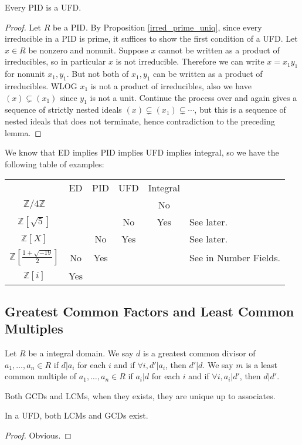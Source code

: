 \begin{theorem}
    Every PID is a UFD.
\end{theorem}
\begin{proof}
    Let $R$ be a PID.
    By Proposition \ref{irred_prime_uniq}, since every irreducible in a PID is prime, it suffices to show the first condition of a UFD.
    Let $x\in R$ be nonzero and nonunit.
    Suppose $x$ cannot be written as a product of irreducibles, so in particular $x$ is not irreducible.
    Therefore we can write $x=x_1y_1$ for nonunit $x_1,y_1$.
    But not both of $x_1,y_1$ can be written as a product of irreducibles.
    WLOG $x_1$ is not a product of irreducibles, also we have $(x)\subsetneq (x_1)$ since $y_1$ is not a unit.
    Continue the process over and again gives a sequence of strictly nested ideals $(x)\subsetneq (x_1)\subsetneq\cdots$, but this is a sequence of nested ideals that does not terminate, hence contradiction to the preceding lemma.
\end{proof}
\begin{example}
    We know that ED implies PID implies UFD implies integral, so we have the following table of examples:
    \begin{center}
        \begin{tabular}{c|c|c|c|c|l}
            &ED&PID&UFD&Integral&\\
            $\mathbb Z/4\mathbb Z$&&&&No&\\
            $\mathbb Z[\sqrt{5}]$&&&No&Yes&See later.\\
            $\mathbb Z[X]$&&No&Yes&&See later.\\
            $\mathbb Z\left[\frac{1+\sqrt{-19}}{2}\right]$&No&Yes&&&See in Number Fields.\\
            $\mathbb Z[i]$&Yes&&&&
        \end{tabular}
    \end{center}
\end{example}
\subsection{Greatest Common Factors and Least Common Multiples}
\begin{definition}
    Let $R$ be a integral domain.
    We say $d$ is a greatest common divisor of $a_1,\ldots,a_n\in R$ if $d|a_i$ for each $i$ and if $\forall i,d'|a_i$, then $d'|d$.
    We say $m$ is a least common multiple of $a_1,\ldots,a_n\in R$ if $a_i|d$ for each $i$ and if $\forall i,a_i|d'$, then $d|d'$.
\end{definition}
Both GCDs and LCMs, when they exists, they are unique up to associates.
\begin{proposition}
    In a UFD, both LCMs and GCDs exist.
\end{proposition}
\begin{proof}
    Obvious.
\end{proof}